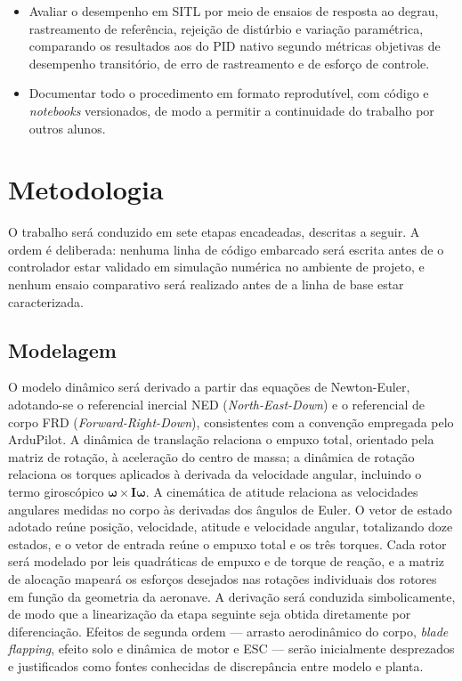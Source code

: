 \documentclass[12pt,a4paper]{article}
\begin{document}
\begin{itemize}[leftmargin=1.2cm,topsep=2pt]
          da reinicialização dos integradores na comutação entre controladores.
    \item Avaliar o desempenho em SITL por meio de ensaios de resposta ao degrau,
          rastreamento de referência, rejeição de distúrbio e variação paramétrica,
          comparando os resultados aos do PID nativo segundo métricas objetivas de
          desempenho transitório, de erro de rastreamento e de esforço de controle.
    \item Documentar todo o procedimento em formato reprodutível, com código e
          \emph{notebooks} versionados, de modo a permitir a continuidade do trabalho
          por outros alunos.
\end{itemize}

\section{Metodologia}

O trabalho será conduzido em sete etapas encadeadas, descritas a seguir. A ordem é
deliberada: nenhuma linha de código embarcado será escrita antes de o controlador
estar validado em simulação numérica no ambiente de projeto, e nenhum ensaio
comparativo será realizado antes de a linha de base estar caracterizada.

\subsection{Modelagem}

O modelo dinâmico será derivado a partir das equações de Newton-Euler, adotando-se
o referencial inercial NED (\emph{North-East-Down}) e o referencial de corpo FRD
(\emph{Forward-Right-Down}), consistentes com a convenção empregada pelo ArduPilot.
A dinâmica de translação relaciona o empuxo total, orientado pela matriz de rotação,
à aceleração do centro de massa; a dinâmica de rotação relaciona os torques
aplicados à derivada da velocidade angular, incluindo o termo giroscópico
$\boldsymbol{\omega} \times \mathbf{I}\boldsymbol{\omega}$. A cinemática de atitude
relaciona as velocidades angulares medidas no corpo às derivadas dos ângulos de
Euler. O vetor de estado adotado reúne posição, velocidade, atitude e velocidade
angular, totalizando doze estados, e o vetor de entrada reúne o empuxo total e os
três torques. Cada rotor será modelado por leis quadráticas de empuxo e de torque de
reação, e a matriz de alocação mapeará os esforços desejados nas rotações
individuais dos rotores em função da geometria da aeronave. A derivação será
conduzida simbolicamente, de modo que a linearização da etapa seguinte seja obtida
diretamente por diferenciação. Efeitos de segunda ordem --- arrasto aerodinâmico do
corpo, \emph{blade flapping}, efeito solo e dinâmica de motor e ESC --- serão
inicialmente desprezados e justificados como fontes conhecidas de discrepância entre
modelo e planta.
\end{document}
